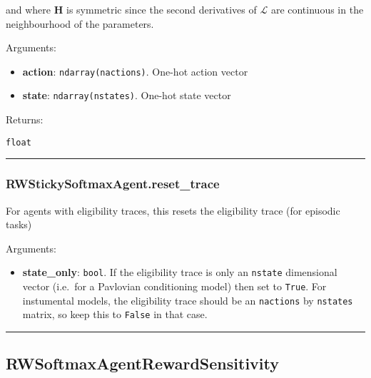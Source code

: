and where \(\mathbf H\) is symmetric since the second derivatives of
\(\mathcal L\) are continuous in the neighbourhood of the parameters.

Arguments:

\begin{itemize}
\tightlist
\item
  \textbf{action}: \texttt{ndarray(nactions)}. One-hot action vector
\item
  \textbf{state}: \texttt{ndarray(nstates)}. One-hot state vector
\end{itemize}

Returns:

\texttt{float}

\begin{center}\rule{0.5\linewidth}{\linethickness}\end{center}

\subsubsection{RWStickySoftmaxAgent.reset\_trace}\label{rwstickysoftmaxagent.reset_trace}

\begin{Shaded}
\begin{Highlighting}[]
\OperatorTok{=}\NormalTok{)}
\end{Highlighting}
\end{Shaded}

For agents with eligibility traces, this resets the eligibility trace
(for episodic tasks)

Arguments:

\begin{itemize}
\tightlist
\item
  \textbf{state\_only}: \texttt{bool}. If the eligibility trace is only
  an \texttt{nstate} dimensional vector (i.e.~for a Pavlovian
  conditioning model) then set to \texttt{True}. For instumental models,
  the eligibility trace should be an \texttt{nactions} by
  \texttt{nstates} matrix, so keep this to \texttt{False} in that case.
\end{itemize}

\begin{center}\rule{0.5\linewidth}{\linethickness}\end{center}

\subsection{RWSoftmaxAgentRewardSensitivity}\label{rwsoftmaxagentrewardsensitivity}

